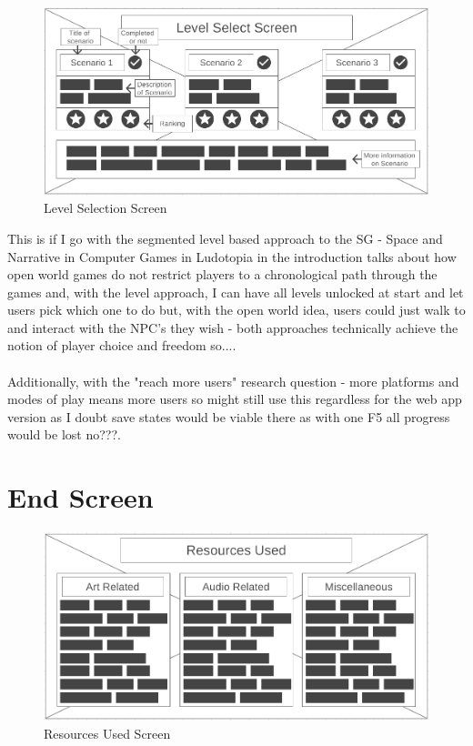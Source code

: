 \documentclass[a4paper]{scrreprt}
\begin{document}
\begin{figure}[H]
\centering
\includegraphics[width=1.1\textwidth]{LevelScreenWireFrame.PNG}
\caption{\label{fig:LSS} Level Selection Screen}
\end{figure} \noindent
This is if I go with the segmented level based approach to the SG - Space and Narrative in Computer Games in Ludotopia in the introduction talks about how open world games do not restrict players to a chronological path through the games and, with the level approach, I can have all levels unlocked at start and let users pick which one to do but, with the open world idea, users could just walk to and interact with the NPC's they wish - both approaches technically achieve the notion of player choice and freedom so....
\\\\
Additionally, with the "reach more users" research question - more platforms and modes of play means more users so might still use this regardless for the web app version as I doubt save states would be viable there as with one F5 all progress would be lost no???.


\section{End Screen}

\begin{figure}[H]
\centering
\includegraphics[width=1.1\textwidth]{ResourceScreenWireFrame.PNG}
\caption{\label{fig:RUS} Resources Used Screen}
\end{figure}
\end{document}

